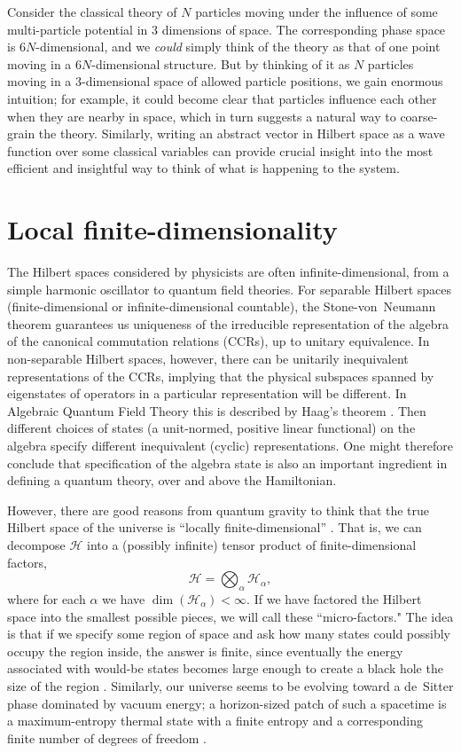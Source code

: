 \documentclass[12pt,english]{article}
\newcommand{\be}{\begin{equation}}
\newcommand{\ee}{\end{equation}}
\newcommand{\HH}{\mathcal{H}}
\begin{document}
Consider the classical theory of $N$ particles moving under the influence of some multi-particle potential in $3$ dimensions of space.
The corresponding phase space is $6N$-dimensional, and we \emph{could} simply think of the theory as that of one point moving in a $6N$-dimensional structure.
But by thinking of it as $N$ particles moving in a $3$-dimensional space of allowed particle positions, we gain enormous intuition; for example, it could become clear that particles influence each other when they are nearby in space, which in turn suggests a natural way to coarse-grain the theory.
Similarly, writing an abstract vector in Hilbert space as a wave function over some classical variables can provide crucial insight into the most efficient and insightful way to think of what is happening to the system.


\section {Local finite-dimensionality}

The Hilbert spaces considered by physicists are often infinite-dimensional, from a simple harmonic oscillator to quantum field theories. For separable Hilbert spaces (finite-dimensional or infinite-dimensional countable), the Stone-von~Neumann theorem guarantees us uniqueness of the irreducible representation of the algebra of the canonical commutation relations (CCRs), up to unitary equivalence. 
In non-separable Hilbert spaces, however, there can be unitarily inequivalent representations of the CCRs, implying that the physical subspaces spanned by eigenstates of operators in a particular representation will be different. 
In Algebraic Quantum Field Theory this is described by Haag's theorem \cite{haag55}. 
Then different choices of states (a unit-normed, positive linear functional) on the algebra specify different inequivalent (cyclic) representations. 
One might therefore conclude that specification of the algebra state is also an important ingredient in defining a quantum theory, over and above the Hamiltonian.

However, there are good reasons from quantum gravity to think that the true Hilbert space of the universe is ``locally finite-dimensional'' \cite{Bao:2017rnv}.
That is, we can decompose $\HH$ into a (possibly infinite) tensor product of finite-dimensional factors,
\be
  \HH = \bigotimes_\alpha \HH_\alpha,
  \label{decomp}
\ee
where for each $\alpha$ we have $\dim (\HH_\alpha) <\infty$.
If we have factored the Hilbert space into the smallest possible pieces, we will call these ``micro-factors."
The idea is that if we specify some region of space and ask how many states could possibly occupy the region inside, the answer is finite, since eventually the energy associated with would-be states becomes large enough to create a black hole the size of the region \cite{bekenstein1981}.
Similarly, our universe seems to be evolving toward a de~Sitter phase dominated by vacuum energy; a horizon-sized patch of such a spacetime is a maximum-entropy thermal state \cite{Carroll:2017kjo} with a finite entropy and a corresponding finite number of degrees of freedom \cite{Fischler2000,Banks2000}.
\end{document}
